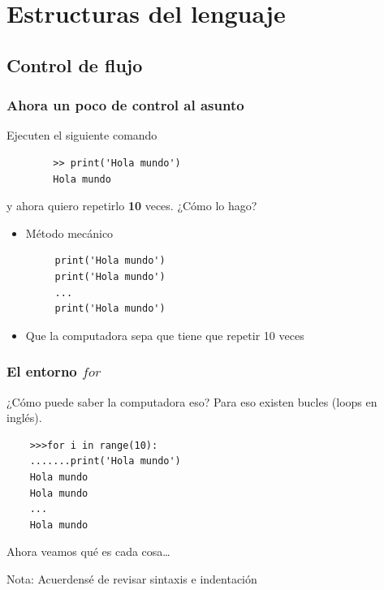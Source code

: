 \documentclass{beamer}
\begin{document}

\section{Estructuras del lenguaje}
\subsection{Control de flujo}
\begin{frame}[fragile]
    \frametitle{Ahora un poco de control al asunto}
    Ejecuten el siguiente comando
    \begin{verbatim}
        >> print('Hola mundo')
        Hola mundo
    \end{verbatim}
    y ahora quiero repetirlo \textbf{10} veces. ¿Cómo lo hago?
    \begin{itemize}
    \item<+> Método mecánico \begin{verbatim}
     print('Hola mundo')
     print('Hola mundo')
     ...
     print('Hola mundo')
    \end{verbatim}
    \item<+> Que la computadora sepa que tiene que repetir 10 veces
    \end{itemize}
\end{frame}

\begin{frame}[fragile]
    \frametitle{El entorno $for$}
    ¿Cómo puede saber la computadora eso? Para eso existen bucles (loops en inglés). 
    \begin{verbatim}
    >>>for i in range(10):
    .......print('Hola mundo')
    Hola mundo
    Hola mundo
    ...
    Hola mundo
    \end{verbatim}
    Ahora veamos qué es cada cosa\ldots
    
    \vspace{5mm}
    \tiny{Nota: Acuerdensé de revisar sintaxis e indentación}
\end{frame}
    
    

\end{document}
